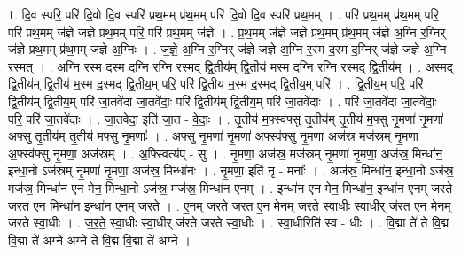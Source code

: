 \documentclass[17pt]{extarticle}
\begin{document}
1. दि॒व स्परि॒ परि॑ दि॒वो दि॒व स्परि॑ प्रथ॒मम् प्र॑थ॒मम् परि॑ दि॒वो दि॒व स्परि॑ प्रथ॒मम् । . परि॑ प्रथ॒मम् प्र॑थ॒मम् परि॒ परि॑ प्रथ॒मम् ज॑ज्ञे जज्ञे प्रथ॒मम् परि॒ परि॑ प्रथ॒मम् ज॑ज्ञे । . प्र॒थ॒मम् ज॑ज्ञे जज्ञे प्रथ॒मम् प्र॑थ॒मम् ज॑ज्ञे अ॒ग्नि र॒ग्निर् ज॑ज्ञे प्रथ॒मम् प्र॑थ॒मम् ज॑ज्ञे अ॒ग्निः । . ज॒ज्ञे॒ अ॒ग्नि र॒ग्निर् ज॑ज्ञे जज्ञे अ॒ग्नि र॒स्म द॒स्म द॒ग्निर् ज॑ज्ञे जज्ञे अ॒ग्नि र॒स्मत् । . अ॒ग्नि र॒स्म द॒स्म द॒ग्नि र॒ग्नि र॒स्मद् द्वि॒तीय॑म् द्वि॒तीय॑ म॒स्म द॒ग्नि र॒ग्नि र॒स्मद् द्वि॒तीय᳚म् । . अ॒स्मद् द्वि॒तीय॑म् द्वि॒तीय॑ म॒स्म द॒स्मद् द्वि॒तीय॒म् परि॒ परि॑ द्वि॒तीय॑ म॒स्म द॒स्मद् द्वि॒तीय॒म् परि॑ । . द्वि॒तीय॒म् परि॒ परि॑ द्वि॒तीय॑म् द्वि॒तीय॒म् परि॑ जा॒तवे॑दा जा॒तवे॑दाः॒ परि॑ द्वि॒तीय॑म् द्वि॒तीय॒म् परि॑ जा॒तवे॑दाः । . परि॑ जा॒तवे॑दा जा॒तवे॑दाः॒ परि॒ परि॑ जा॒तवे॑दाः । . जा॒तवे॑दा॒ इति॑ जा॒त - वे॒दाः॒ । . तृ॒तीय॑ म॒फ्स्व॑फ्सु तृ॒तीय॑म् तृ॒तीय॑ म॒फ्सु नृ॒मणा॑ नृ॒मणा॑ अ॒फ्सु तृ॒तीय॑म् तृ॒तीय॑ म॒फ्सु नृ॒मणाः᳚ । . अ॒फ्सु नृ॒मणा॑ नृ॒मणा॑ अ॒फ्स्व॑फ्सु नृ॒मणा॒ अज॑स्र॒ मज॑स्रम् नृ॒मणा॑ अ॒फ्स्व॑फ्सु नृ॒मणा॒ अज॑स्रम् । . अ॒फ्स्वित्य॑प् - सु । . नृ॒मणा॒ अज॑स्र॒ मज॑स्रम् नृ॒मणा॑ नृ॒मणा॒ अज॑स्र॒ मिन्धा॑न॒ इन्धा॒नो ऽज॑स्रम् नृ॒मणा॑ नृ॒मणा॒ अज॑स्र॒ मिन्धा॑नः । . नृ॒मणा॒ इति॑ नृ - मनाः᳚ । . अज॑स्र॒ मिन्धा॑न॒ इन्धा॒नो ऽज॑स्र॒ मज॑स्र॒ मिन्धा॑न एन मेन॒ मिन्धा॒नो ऽज॑स्र॒ मज॑स्र॒ मिन्धा॑न एनम् । . इन्धा॑न एन मेन॒ मिन्धा॑न॒ इन्धा॑न एनम् जरते जरत एन॒ मिन्धा॑न॒ इन्धा॑न एनम् जरते । . ए॒न॒म् ज॒र॒ते॒ ज॒र॒त॒ ए॒न॒ मे॒न॒म् ज॒र॒ते॒ स्वा॒धीः स्वा॒धीर् ज॑रत एन मेनम् जरते स्वा॒धीः । . ज॒र॒ते॒ स्वा॒धीः स्वा॒धीर् ज॑रते जरते स्वा॒धीः । . स्वा॒धीरिति॑ स्व - धीः । . वि॒द्मा ते॑ ते वि॒द्म वि॒द्मा ते॑ अग्ने अग्ने ते वि॒द्म वि॒द्मा ते॑ अग्ने । \newline
\end{document}

